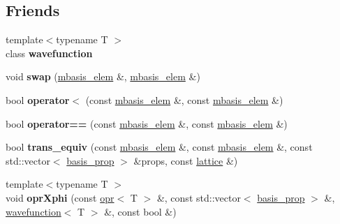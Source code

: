 \subsection*{Friends}
\begin{DoxyCompactItemize}
\item 
\mbox{\label{classqbasis_1_1mbasis__elem_ace8419548b027e8f9ff704da902607f4}} 
{\footnotesize template$<$typename T $>$ }\\class {\bfseries wavefunction}
\item 
\mbox{\label{classqbasis_1_1mbasis__elem_a93f8b3c7b6d7f67ec18bc30afdd4fc8b}} 
void {\bfseries swap} (\hyperlink{classqbasis_1_1mbasis__elem}{mbasis\+\_\+elem} \&, \hyperlink{classqbasis_1_1mbasis__elem}{mbasis\+\_\+elem} \&)
\item 
\mbox{\label{classqbasis_1_1mbasis__elem_a547cc97bfdefa17fd53e8daeb713d70b}} 
bool {\bfseries operator$<$} (const \hyperlink{classqbasis_1_1mbasis__elem}{mbasis\+\_\+elem} \&, const \hyperlink{classqbasis_1_1mbasis__elem}{mbasis\+\_\+elem} \&)
\item 
\mbox{\label{classqbasis_1_1mbasis__elem_aea96c2c5e9d4474fa70d0807281240e3}} 
bool {\bfseries operator==} (const \hyperlink{classqbasis_1_1mbasis__elem}{mbasis\+\_\+elem} \&, const \hyperlink{classqbasis_1_1mbasis__elem}{mbasis\+\_\+elem} \&)
\item 
\mbox{\label{classqbasis_1_1mbasis__elem_aec8d4a05e82db36e12ea4b7b9b81bc6a}} 
bool {\bfseries trans\+\_\+equiv} (const \hyperlink{classqbasis_1_1mbasis__elem}{mbasis\+\_\+elem} \&, const \hyperlink{classqbasis_1_1mbasis__elem}{mbasis\+\_\+elem} \&, const std\+::vector$<$ \hyperlink{classqbasis_1_1basis__prop}{basis\+\_\+prop} $>$ \&props, const \hyperlink{classqbasis_1_1lattice}{lattice} \&)
\item 
\mbox{\label{classqbasis_1_1mbasis__elem_a86b5c0390d3d62a385dfa0aa3afbd929}} 
{\footnotesize template$<$typename T $>$ }\\void {\bfseries opr\+Xphi} (const \hyperlink{classqbasis_1_1opr}{opr}$<$ T $>$ \&, const std\+::vector$<$ \hyperlink{classqbasis_1_1basis__prop}{basis\+\_\+prop} $>$ \&, \hyperlink{classqbasis_1_1wavefunction}{wavefunction}$<$ T $>$ \&, const bool \&)

\end{DoxyCompactItemize}
